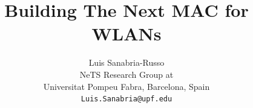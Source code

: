 \documentclass[a4paper,journal]{IEEEtran}
\begin{document}
 \title{Building The Next MAC for WLANs}



\author{Luis Sanabria-Russo \\
		NeTS Research Group at\\
		Universitat Pompeu Fabra, Barcelona, Spain\\
		\texttt{Luis.Sanabria@upf.edu}}



\maketitle
\end{document}
